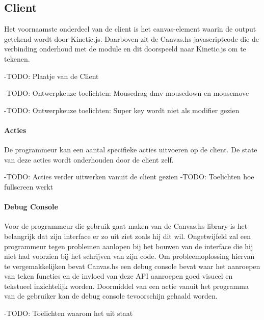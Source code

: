 
\subsection{Client}
Het voornaamste onderdeel van de client is het canvas-element waarin de output getekend wordt door Kinetic.js. Daarboven zit de Canvas.hs javascriptcode die de verbinding onderhoud met de module en dit doorspeeld naar Kinetic.js om te tekenen.

-TODO: Plaatje van de Client

-TODO: Ontwerpkeuze toelichten: Mousedrag dmv mousedown en mousemove

-TODO: Ontwerpkeuze toelichten: Super key wordt niet als modifier gezien

\paragraph{Acties}
De programmeur kan een aantal specifieke acties uitvoeren op de client. De state van deze acties wordt onderhouden door de client zelf. 

-TODO: Acties verder uitwerken vanuit de client gezien
-TODO: Toelichten hoe fullscreen werkt

\paragraph{Debug Console}
Voor de programmeur die gebruik gaat maken van de Canvas.hs library is het belangrijk dat zijn interface er zo uit ziet zoals hij dit wil. Ongetwijfeld zal een programmeur tegen problemen aanlopen bij het bouwen van de interface die hij niet had voorzien bij het schrijven van zijn code. Om probleemoplossing hiervan te vergemakkelijken bevat Canvas.hs een debug console bevat waar het aanroepen van teken functies en de invloed van deze API aanroepen goed visueel en tekstueel inzichtelijk worden. Doormiddel van een actie vanuit het programma van de gebruiker kan de debug console tevoorschijn gehaald worden.

-TODO: Toelichten waarom het uit staat